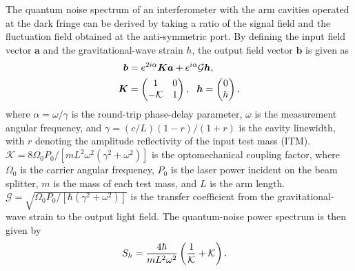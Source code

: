 \documentclass{iopjournal}
\begin{document}
The quantum noise spectrum of an interferometer with the arm cavities operated at the dark fringe can be derived by taking a ratio of the signal field and the fluctuation field obtained at the anti-symmetric port. By defining the input field vector $\boldsymbol{a}$ and the gravitational-wave strain $h$, the output field vector $\boldsymbol{b}$ is given as 
\begin{align}            \boldsymbol{b}&=e^{2i\alpha}\boldsymbol{Ka}+e^{i\alpha}{\cal G}\boldsymbol{h},\\
\boldsymbol{K}&=
    \begin{pmatrix}
        1 & 0\\
        -{\cal K} & 1
    \end{pmatrix},\ \ 
    \boldsymbol{h}=
    \begin{pmatrix}
        0\\
        h
    \end{pmatrix},\nonumber
\end{align}
where \(\alpha=\omega/\gamma\) is the round-trip phase-delay parameter,
\(\omega\) is the measurement angular frequency, and
\(\gamma=(c/L)(1-r)/(1+r)\) is the cavity linewidth, with \(r\)
denoting the amplitude reflectivity of the input test mass (ITM).
\(\mathcal{K}=8\Omega_0P_0/
[mL^2\omega^2(\gamma^2+\omega^2)]\)
is the optomechanical coupling factor, where \(\Omega_0\) is the carrier
angular frequency, \(P_0\) is the laser power incident on the beam
splitter, \(m\) is the mass of each test mass, and \(L\) is the arm
length. \(\mathcal{G}=\sqrt{\Omega_0P_0/
[\hbar(\gamma^2+\omega^2)]}\)
is the transfer coefficient from the gravitational-wave strain to the
output light field. The quantum-noise power spectrum is then given by
\begin{align}
S_h&=\frac{4\hbar}{mL^2\omega^2}\left(\frac{1}{\cal K}+\cal K\right).\label{eq:ShFPMI}
\end{align}
\end{document}
